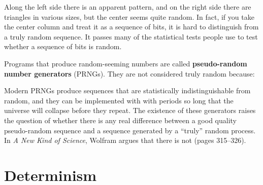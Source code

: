 \documentclass[12pt]{book}
\theoremstyle{exercise}
\newcommand{\py}{\verb}%}
\begin{document}
Along the left side there is an apparent pattern, and on the right
side there are triangles in various sizes, but the center seems
quite random.  In fact, if you take the center column and treat it as a
sequence of bits, it is hard to distinguish from a truly random
sequence.  It passes many of the statistical tests people use
to test whether a sequence of bits is random.

Programs that produce random-seeming numbers are called
{\bf pseudo-random number generators} (PRNGs).  They are not considered
truly random because:



Modern PRNGs produce sequences that are statistically
indistinguishable from random, and they can be implemented with with
periods so long that the universe will collapse before they repeat.
The existence of these generators raises the question of whether there
is any real difference between a good quality pseudo-random sequence
and a sequence generated by a ``truly'' random process.  In {\em A New
  Kind of Science}, Wolfram argues that there is not (pages 315--326).


\section{Determinism}
\label{determinism}
\end{document}
